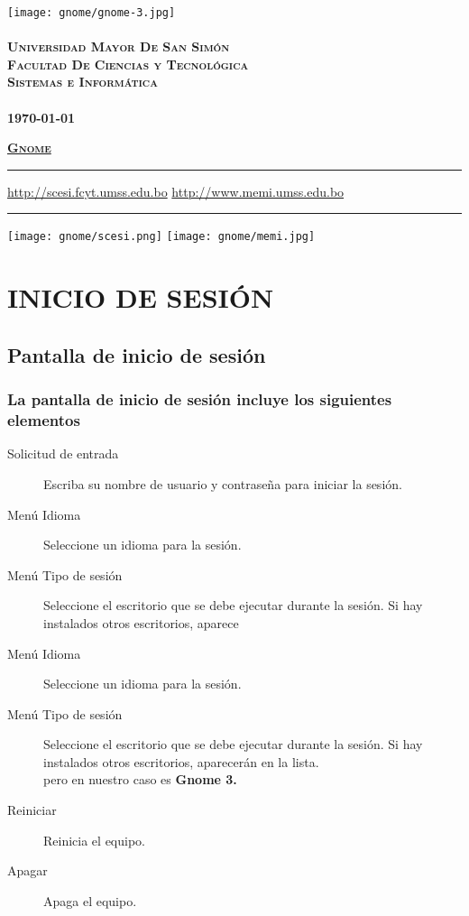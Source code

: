 \documentclass[12pt,letterpaper]{book}
\begin{document}
 \begin{titlepage}
	\thispagestyle{empty}
	\begin{center}
		\texttt{[image: gnome/gnome-3.jpg]} \\
		~\\
		\Large{\textsc{\bf Universidad Mayor De San Simón}}\\
		\large{\textsc{\bf Facultad De Ciencias y Tecnológica}}\\
		\large{\textsc{\bf Sistemas e Informática}}\\
		~\\
		\small{\bf \today}
	\end{center}
 	\vfill
	\begin{center}
		\Huge{\underline{\textsc{\bf Gnome}}}
	\end{center}
	\vfill
	\hrule
	\vspace{0.1cm}
	\noindent\small{\url{http://scesi.fcyt.umss.edu.bo} \hfill \url{http://www.memi.umss.edu.bo}}
	\hrule
	\vspace{0.1cm}
	\noindent\small{\hspace{1.15cm}\texttt{[image: gnome/scesi.png]} \hfill \texttt{[image: gnome/memi.jpg]}\hspace{0.83cm}}

\end{titlepage}

\tableofcontents
\part{INICIO DE SESIÓN}
\chapter{Pantalla de inicio de sesión}
\section{La pantalla de inicio de sesión incluye los siguientes elementos}
\begin{description}
\item[Solicitud de entrada] Escriba su nombre de usuario y contraseña para iniciar la sesión.
\item[Menú Idioma] Seleccione un idioma para la sesión.
\item [Menú Tipo de sesión] Seleccione el escritorio que se debe ejecutar durante la sesión. Si hay instalados otros escritorios, aparece
\item[Menú Idioma] Seleccione un idioma para la sesión.
\item [Menú Tipo de sesión] Seleccione el escritorio que se debe ejecutar durante la sesión. Si hay instalados otros escritorios, aparecerán en la lista.\\ pero en nuestro caso es {\bf Gnome 3.}
\item[Reiniciar] Reinicia el equipo.
\item[Apagar] Apaga el equipo.
\end{description}
\end{document}
